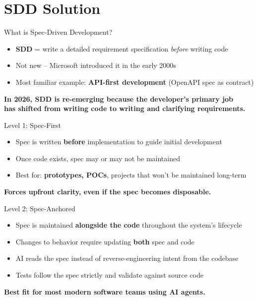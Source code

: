 \documentclass[aspectratio=169]{beamer}
\begin{document}
\section{SDD Solution}

\begin{frame}{What is Spec-Driven Development?}
    \begin{itemize}
        \item \textbf{SDD} = write a detailed requirement specification \textit{before} writing code
        \item Not new -- Microsoft introduced it in the early 2000s
        \item Most familiar example: \textbf{API-first development} (OpenAPI spec as contract)
    \end{itemize}

    \vspace{0.5cm}
    \colorbox{utu_blue!20}{\parbox{0.9\textwidth}{
        \centering
        \textbf{In 2026, SDD is re-emerging because the developer's primary job\\has shifted from writing code to writing and clarifying requirements.}
    }}
\end{frame}

\begin{frame}{Level 1: Spec-First}
    \begin{itemize}
        \item Spec is written \textbf{before} implementation to guide initial development
        \item Once code exists, spec may or may not be maintained
        \item Best for: \textbf{prototypes, POCs}, projects that won't be maintained long-term
    \end{itemize}

    \vspace{0.5cm}
    \colorbox{utu_green!20}{\parbox{0.9\textwidth}{
        \centering
        \textbf{Forces upfront clarity, even if the spec becomes disposable.}
    }}
\end{frame}

\begin{frame}{Level 2: Spec-Anchored}
    \begin{itemize}
        \item Spec is maintained \textbf{alongside the code} throughout the system's lifecycle
        \item Changes to behavior require updating \textbf{both} spec and code
        \item AI reads the spec instead of reverse-engineering intent from the codebase
        \item Tests follow the spec strictly and validate against source code
    \end{itemize}

    \vspace{0.5cm}
    \colorbox{utu_green!20}{\parbox{0.9\textwidth}{
        \centering
        \textbf{Best fit for most modern software teams using AI agents.}
    }}
\end{frame}
\end{document}
